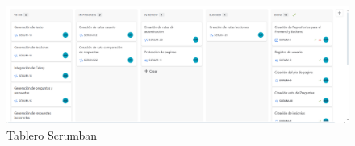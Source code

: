 \begin{figure}[H]
  \centering
  \includegraphics[width=1\linewidth]{Imagenes/tablero_tg.png}
  \caption{Tablero Scrumban}
  \label{fig:tablero}
\end{figure}

